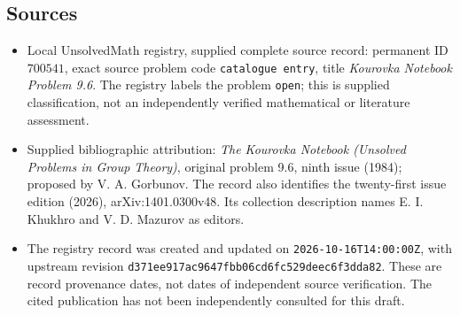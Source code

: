 \documentclass[11pt]{article}
\begin{document}
\subsection{Sources}
\begin{itemize}
\item Local UnsolvedMath registry, supplied complete source record: permanent ID \(700541\), exact source problem code \texttt{catalogue entry}, title \emph{Kourovka Notebook Problem 9.6}. The registry labels the problem \texttt{open}; this is supplied classification, not an independently verified mathematical or literature assessment.
\item Supplied bibliographic attribution: \emph{The Kourovka Notebook (Unsolved Problems in Group Theory)}, original problem 9.6, ninth issue (1984); proposed by V. A. Gorbunov. The record also identifies the twenty-first issue edition (2026), arXiv:1401.0300v48. Its collection description names E. I. Khukhro and V. D. Mazurov as editors.
\item The registry record was created and updated on \texttt{2026-10-16T14:00:00Z}, with upstream revision \texttt{d371ee917ac9647fbb06cd6fc529deec6f3dda82}. These are record provenance dates, not dates of independent source verification. The cited publication has not been independently consulted for this draft.
\end{itemize}
\end{document}
